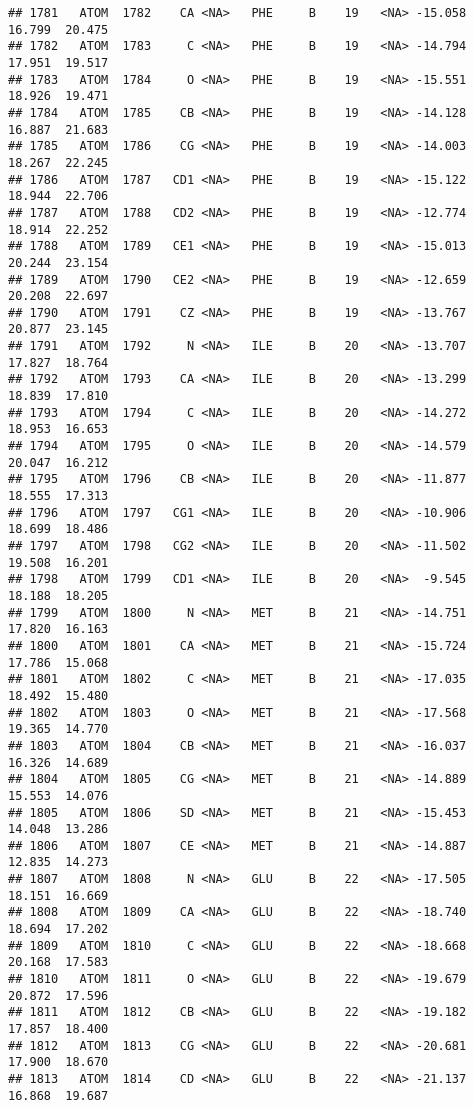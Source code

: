 \documentclass[
]{article}
\begin{document}
\begin{verbatim}
## 1781   ATOM  1782    CA <NA>   PHE     B    19   <NA> -15.058  16.799  20.475
## 1782   ATOM  1783     C <NA>   PHE     B    19   <NA> -14.794  17.951  19.517
## 1783   ATOM  1784     O <NA>   PHE     B    19   <NA> -15.551  18.926  19.471
## 1784   ATOM  1785    CB <NA>   PHE     B    19   <NA> -14.128  16.887  21.683
## 1785   ATOM  1786    CG <NA>   PHE     B    19   <NA> -14.003  18.267  22.245
## 1786   ATOM  1787   CD1 <NA>   PHE     B    19   <NA> -15.122  18.944  22.706
## 1787   ATOM  1788   CD2 <NA>   PHE     B    19   <NA> -12.774  18.914  22.252
## 1788   ATOM  1789   CE1 <NA>   PHE     B    19   <NA> -15.013  20.244  23.154
## 1789   ATOM  1790   CE2 <NA>   PHE     B    19   <NA> -12.659  20.208  22.697
## 1790   ATOM  1791    CZ <NA>   PHE     B    19   <NA> -13.767  20.877  23.145
## 1791   ATOM  1792     N <NA>   ILE     B    20   <NA> -13.707  17.827  18.764
## 1792   ATOM  1793    CA <NA>   ILE     B    20   <NA> -13.299  18.839  17.810
## 1793   ATOM  1794     C <NA>   ILE     B    20   <NA> -14.272  18.953  16.653
## 1794   ATOM  1795     O <NA>   ILE     B    20   <NA> -14.579  20.047  16.212
## 1795   ATOM  1796    CB <NA>   ILE     B    20   <NA> -11.877  18.555  17.313
## 1796   ATOM  1797   CG1 <NA>   ILE     B    20   <NA> -10.906  18.699  18.486
## 1797   ATOM  1798   CG2 <NA>   ILE     B    20   <NA> -11.502  19.508  16.201
## 1798   ATOM  1799   CD1 <NA>   ILE     B    20   <NA>  -9.545  18.188  18.205
## 1799   ATOM  1800     N <NA>   MET     B    21   <NA> -14.751  17.820  16.163
## 1800   ATOM  1801    CA <NA>   MET     B    21   <NA> -15.724  17.786  15.068
## 1801   ATOM  1802     C <NA>   MET     B    21   <NA> -17.035  18.492  15.480
## 1802   ATOM  1803     O <NA>   MET     B    21   <NA> -17.568  19.365  14.770
## 1803   ATOM  1804    CB <NA>   MET     B    21   <NA> -16.037  16.326  14.689
## 1804   ATOM  1805    CG <NA>   MET     B    21   <NA> -14.889  15.553  14.076
## 1805   ATOM  1806    SD <NA>   MET     B    21   <NA> -15.453  14.048  13.286
## 1806   ATOM  1807    CE <NA>   MET     B    21   <NA> -14.887  12.835  14.273
## 1807   ATOM  1808     N <NA>   GLU     B    22   <NA> -17.505  18.151  16.669
## 1808   ATOM  1809    CA <NA>   GLU     B    22   <NA> -18.740  18.694  17.202
## 1809   ATOM  1810     C <NA>   GLU     B    22   <NA> -18.668  20.168  17.583
## 1810   ATOM  1811     O <NA>   GLU     B    22   <NA> -19.679  20.872  17.596
## 1811   ATOM  1812    CB <NA>   GLU     B    22   <NA> -19.182  17.857  18.400
## 1812   ATOM  1813    CG <NA>   GLU     B    22   <NA> -20.681  17.900  18.670
## 1813   ATOM  1814    CD <NA>   GLU     B    22   <NA> -21.137  16.868  19.687

\end{verbatim}
\end{document}
